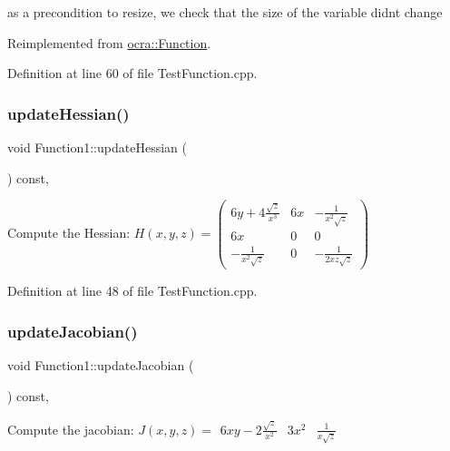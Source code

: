 as a precondition to resize, we check that the size of the variable didn\textquotesingle{}t change 

Reimplemented from \hyperlink{classocra_1_1Function_a3f728f3758e6448aa59932853db5ddcc}{ocra\+::\+Function}.



Definition at line 60 of file Test\+Function.\+cpp.

\hypertarget{classFunction1_a1d88a2ebb5ad3cb35f7d40ab002b71f0}{}\label{classFunction1_a1d88a2ebb5ad3cb35f7d40ab002b71f0} 
\subsubsection{\texorpdfstring{update\+Hessian()}{updateHessian()}}
{\footnotesize\ttfamily void Function1\+::update\+Hessian (\begin{DoxyParamCaption}{ }\end{DoxyParamCaption}) const\hspace{0.3cm}{\ttfamily [inline]}, {\ttfamily [protected]}}

Compute the Hessian\+: $ H(x,y,z) = \left(\begin{array}{lcr} 6y + 4\frac{\sqrt{z}}{x^3} & 6x & -\frac{1}{x^2 \sqrt{z}} \\ 6x & 0 & 0 \\ -\frac{1}{x^2 \sqrt{z}} & 0 & -\frac{1}{2xz \sqrt{z}} \end{array}\right) $ 

Definition at line 48 of file Test\+Function.\+cpp.

\hypertarget{classFunction1_aff45595ff1b5fb4108e5313b31d3d774}{}\label{classFunction1_aff45595ff1b5fb4108e5313b31d3d774} 
\subsubsection{\texorpdfstring{update\+Jacobian()}{updateJacobian()}}
{\footnotesize\ttfamily void Function1\+::update\+Jacobian (\begin{DoxyParamCaption}{ }\end{DoxyParamCaption}) const\hspace{0.3cm}{\ttfamily [inline]}, {\ttfamily [protected]}}

Compute the jacobian\+: $J(x,y,z) = \begin{array}{lcr} 6xy - 2 \frac{\sqrt{z}}{x^2} & 3x^2 & \frac{1}{x \sqrt{z}} \end{array} $ 

